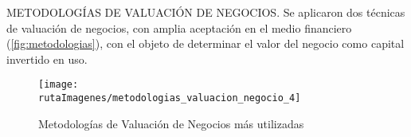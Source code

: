 

\textcolor{secundario}{METODOLOG\'IAS DE VALUACI\'ON DE NEGOCIOS}. Se aplicaron dos t\'ecnicas de valuaci\'on de negocios, con amplia aceptaci\'on en el medio financiero (\autoref{fig:metodologias}), con el objeto de determinar el valor del negocio como capital invertido en uso.\\

\begin{figure}[H]
\centering
\caption{Metodolog\'ias de Valuaci\'on de Negocios m\'as utilizadas\label{fig:metodologias}}
\texttt{[image: \\rutaImagenes/metodologias\_valuacion\_negocio\_4]}\\

\end{figure}
